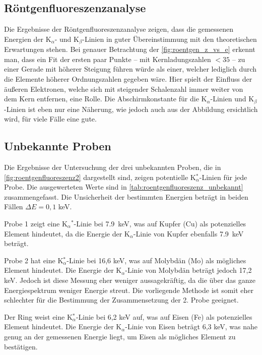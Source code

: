 \documentclass[ngerman]{scrartcl}
\begin{document}
\subsection{Röntgenfluoreszenzanalyse}
\label{sec:diskussion_roentgen}
Die Ergebnisse der Röntgenfluoreszenzanalyse zeigen, dass die gemessenen Energien der K$_{\alpha}$- und K$_{\beta}$-Linien in guter Übereinstimmung mit den theoretischen Erwartungen stehen. Bei genauer Betrachtung der \autoref{fig:roentgen_z_vs_e} erkennt man, dass ein Fit der ersten paar Punkte -- mit Kernladungszahlen $<35$ -- zu einer Gerade mit höherer Steigung führen würde als einer, welcher lediglich durch die Elemente höherer Ordnungszahlen gegeben wäre. Hier spielt der Einfluss der äußeren Elektronen, welche sich mit steigender Schalenzahl immer weiter von dem Kern entfernen, eine Rolle. Die Abschirmkonstante für die K$_{\alpha}$-Linien und K$_{\beta}$-Linien ist eben nur eine Näherung, wie jedoch auch aus der Abbildung ersichtlich wird, für viele Fälle eine gute.

\subsection{Unbekannte Proben}
\label{sec:diskussion_unbekannt}

Die Ergebnisse der Untersuchung der drei unbekannten Proben, die in \autoref{fig:roentgenfluoreszenz2} dargestellt sind, zeigen potentielle K$_{\alpha}^*$-Linien für jede Probe. Die ausgewerteten Werte sind in \autoref{tab:roentgenfluoreszenz_unbekannt} zusammengefasst. Die Unsicherheit der bestimmten Energien beträgt in beiden Fällen $\Delta E = 0,1$ keV.

Probe 1 zeigt eine K${_\alpha}^*$-Linie bei \SI{7.9}{\kilo\electronvolt}, was auf Kupfer (Cu) als potenzielles Element hindeutet, da die Energie der K${_\alpha}$-Linie von Kupfer ebenfalls \SI{7.9}{\kilo\electronvolt} beträgt.

Probe 2 hat eine K$_{\alpha}^*$-Linie bei 16,6 keV, was auf Molybdän (Mo) als mögliches Element hindeutet. Die Energie der K$_{\alpha}$-Linie von Molybdän beträgt jedoch 17,2 keV. Jedoch ist diese Messung eher weniger aussagekräftig, da die über das ganze Energiespektrum weniger Energie streut. Die vorliegende Methode ist somit eher schlechter für die Bestimmung der Zusammensetzung der 2. Probe geeignet. 

Der Ring weist eine K$_{\alpha}^*$-Linie bei 6,2 keV auf, was auf Eisen (Fe) als potenzielles Element hindeutet. Die Energie der K$_{\alpha}$-Linie von Eisen beträgt 6,3 keV, was nahe genug an der gemessenen Energie liegt, um Eisen als mögliches Element zu bestätigen.
\end{document}
